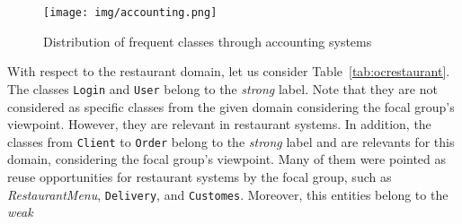 \begin{figure}[!h]
\centering
\texttt{[image: img/accounting.png]}
\caption{Distribution of frequent classes through accounting systems}
\label{fig:accounting}
\end{figure}


\newpage
With respect to the restaurant domain, let us consider Table~\ref{tab:ocrestaurant}. The classes \texttt{Login} and \texttt{User} belong to the \textit{strong} label. Note that they are not considered as specific classes from the given domain considering the focal group's viewpoint. However, they are relevant in restaurant systems. In addition, the classes from \texttt{Client} to \texttt{Order} belong to the \textit{strong} label and are relevants for this domain, considering the focal group's viewpoint. Many of them were pointed as reuse opportunities for restaurant systems by the focal group, such as \textit{RestaurantMenu}, \texttt{Delivery}, and \texttt{Customes}. Moreover,  this entities   belong to the \textit{weak}


